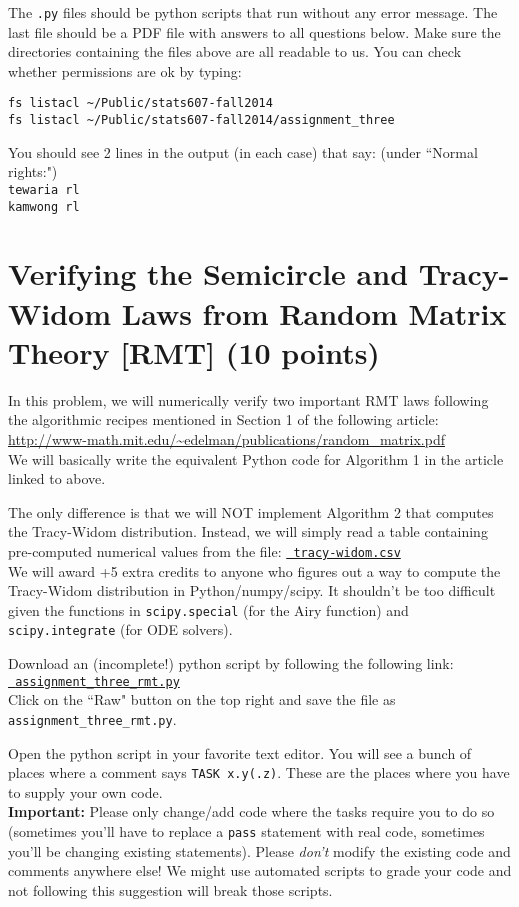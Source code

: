 \documentclass{article}
\begin{document}
The {\tt .py} files should be python scripts that run without any error message. The last file should be a PDF file with answers to all questions below. Make sure the directories
containing the files above are all readable to us. You can check whether permissions are ok by typing:
\begin{verbatim}
fs listacl ~/Public/stats607-fall2014
fs listacl ~/Public/stats607-fall2014/assignment_three
\end{verbatim}
You should see 2 lines in the output (in each case) that say: (under ``Normal rights:")\\
{\tt tewaria rl}\\
{\tt kamwong rl}

\section{Verifying the Semicircle and Tracy-Widom Laws from Random Matrix
Theory [RMT] (10 points)}

In this problem, we will numerically verify two important RMT laws following
the algorithmic recipes mentioned in Section 1 of the following article: \\
\url{http://www-math.mit.edu/~edelman/publications/random_matrix.pdf}\\
We will basically write the equivalent Python code for Algorithm 1 in the article linked to above.

The only difference is that we will NOT implement Algorithm 2 that computes the
Tracy-Widom distribution. Instead, we will simply read a table containing
pre-computed numerical values from the file:
\href{https://github.com/ambujtewari/stats607a-fall2014/blob/master/homeworks/datasets/tracy-widom.csv}{\tt
tracy-widom.csv} \\
We will award +5 extra credits to anyone who figures out a way to compute the Tracy-Widom distribution in Python/numpy/scipy.
It shouldn't be too difficult given the functions in {\tt scipy.special} (for the Airy function) and {\tt scipy.integrate} (for ODE
solvers).

Download an (incomplete!) python script by following the following
link:\\
\href{https://github.com/ambujtewari/stats607a-fall2014/blob/master/homeworks/assignment_three_rmt.py}{\tt
assignment\_three\_rmt.py} \\
Click on the ``Raw" button on the top right and save the file as {\tt
assignment\_three\_rmt.py}.

Open the python script in your favorite text editor. You will see a bunch of places where a comment says {\tt TASK x.y(.z)}. These are the places where you have to supply your
own code.\\
{\bf Important:} Please only change/add code where the tasks require you to do so (sometimes you'll have to replace a {\tt pass} statement with real code, sometimes you'll be changing existing statements). Please {\em don't} modify the existing code and comments anywhere else! We might use automated scripts to grade your code and not following this suggestion will break those scripts.
\end{document}
